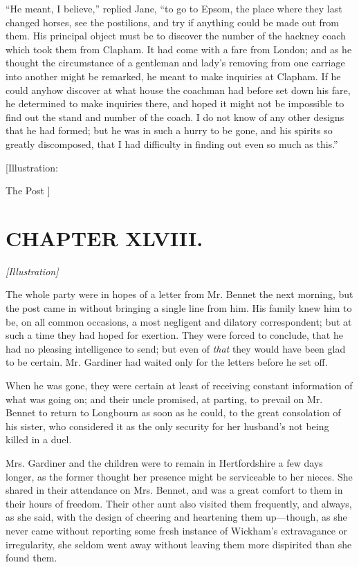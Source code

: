 \documentclass[12pt]{book}
\begin{document}
``He meant, I believe,'' replied Jane, ``to go to Epsom, the place where they last changed horses, see the postilions, and try if anything could be made out from them. His principal object must be to discover the number of the hackney coach which took them from Clapham. It had come with a fare from London; and as he thought the circumstance of a gentleman and lady's removing from one carriage into another might be remarked, he meant to make inquiries at Clapham. If he could anyhow discover at what house the coachman had before set down his fare, he determined to make inquiries there, and hoped it might not be impossible to find out the stand and number of the coach. I do not know of any other designs that he had formed; but he was in such a hurry to be gone, and his spirits so greatly discomposed, that I had difficulty in finding out even so much as this.''

[Illustration:

The Post ]

\chapter{CHAPTER XLVIII.}

\emph{[Illustration]}

The whole party were in hopes of a letter from Mr. Bennet the next morning, but the post came in without bringing a single line from him. His family knew him to be, on all common occasions, a most negligent and dilatory correspondent; but at such a time they had hoped for exertion. They were forced to conclude, that he had no pleasing intelligence to send; but even of \textit{that} they would have been glad to be certain. Mr. Gardiner had waited only for the letters before he set off.

When he was gone, they were certain at least of receiving constant information of what was going on; and their uncle promised, at parting, to prevail on Mr. Bennet to return to Longbourn as soon as he could, to the great consolation of his sister, who considered it as the only security for her husband's not being killed in a duel.

Mrs. Gardiner and the children were to remain in Hertfordshire a few days longer, as the former thought her presence might be serviceable to her nieces. She shared in their attendance on Mrs. Bennet, and was a great comfort to them in their hours of freedom. Their other aunt also visited them frequently, and always, as she said, with the design of cheering and heartening them up---though, as she never came without reporting some fresh instance of Wickham's extravagance or irregularity, she seldom went away without leaving them more dispirited than she found them.
\end{document}
